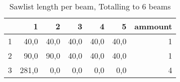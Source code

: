 \begin{table}[h!]
\centering
\caption{Sawlist length per beam, Totalling to 6 beams}
\begin{tabular}{lrrrrrr}
\toprule
{} &     1 &    2 &    3 &    4 &    5 &  ammount \\
\midrule
1 &  40,0 & 40,0 & 40,0 & 40,0 & 40,0 &        1 \\
2 &  90,0 & 90,0 & 40,0 & 40,0 & 40,0 &        1 \\
3 & 281,0 &  0,0 &  0,0 &  0,0 &  0,0 &        4 \\
\bottomrule
\end{tabular}
\end{table}

